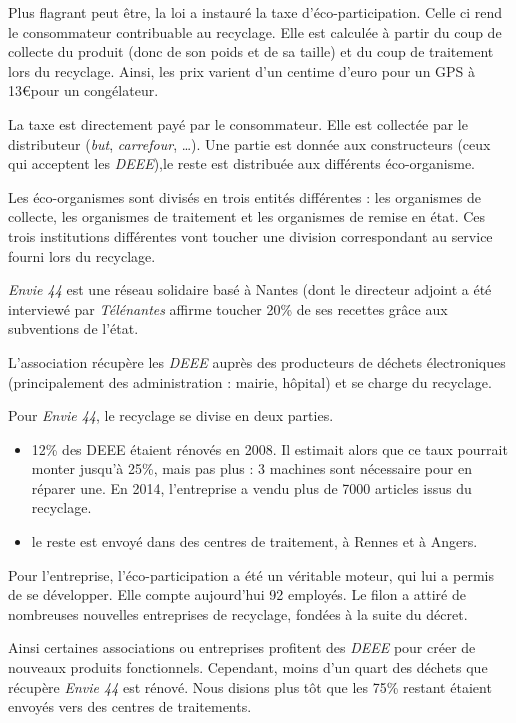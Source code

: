 Plus flagrant peut être, la loi a instauré la taxe d'éco-participation. Celle ci rend le consommateur contribuable au recyclage. Elle est calculée à partir du coup de collecte du produit (donc de son poids et de sa taille) et du coup de traitement lors du recyclage. Ainsi, les prix varient d'un centime d'euro pour un GPS à 13\euro pour un congélateur. 

La taxe est directement payé par le consommateur. Elle est collectée par le distributeur (\textit{but}, \textit{carrefour}, \dots). Une partie est donnée aux constructeurs (ceux qui acceptent les \textit{DEEE}),le reste est distribuée aux différents éco-organisme. 

Les éco-organismes sont divisés en trois entités différentes : les organismes de collecte, les organismes de traitement et les organismes de remise en état. Ces trois institutions différentes vont toucher une division correspondant au service fourni lors du recyclage. 

\medbreak


\textit{Envie 44}  est une réseau solidaire basé à Nantes (dont le directeur adjoint a été interviewé par \textit{Télénantes} affirme toucher 20\% de ses recettes grâce aux subventions de l'état\cite{7andco}.

L'association récupère les \textit{DEEE} auprès des producteurs de déchets électroniques (principalement des administration : mairie, hôpital) et se charge du recyclage. 

Pour \textit{Envie 44}, le recyclage se divise en deux parties. 
\begin{itemize}
\item 12\% des DEEE étaient rénovés en 2008. Il estimait alors que ce taux pourrait monter jusqu'à 25\%, mais pas plus : 3 machines sont nécessaire pour en réparer une. En 2014, l'entreprise a vendu plus de 7000 articles issus du recyclage. 
\item le reste est envoyé dans des centres de traitement, à Rennes et à Angers.
\end{itemize}

Pour l'entreprise, l'éco-participation a été un véritable moteur, qui lui a permis de se développer. Elle compte aujourd'hui 92 employés. Le filon a attiré de nombreuses nouvelles entreprises de recyclage, fondées à la suite du décret. 


\bigbreak

Ainsi certaines associations ou entreprises profitent des \textit{DEEE} pour créer de nouveaux produits fonctionnels. Cependant, moins d'un quart des déchets que récupère \textit{Envie 44} est rénové. Nous disions plus tôt que les 75\% restant étaient envoyés vers  des centres de traitements. 

